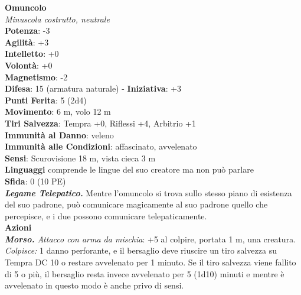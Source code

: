 \begin{multicols}{2}
\medskip\textbf{Omuncolo}\\
\emph{Minuscola costrutto, neutrale}\\
\textbf{Potenza}: -3\\
\textbf{Agilità}: +3\\
\textbf{Intelletto}: +0\\
\textbf{Volontà}: +0\\
\textbf{Magnetismo}: -2\\
\textbf{Difesa}: 15 (armatura naturale) - \textbf{Iniziativa}: +3\\
\textbf{Punti Ferita}: 5 (2d4)\\
\textbf{Movimento}: 6 m, volo 12 m\\
\textbf{Tiri Salvezza}:  Tempra +0, Riflessi +4, Arbitrio +1\\
\textbf{Immunità al Danno}: veleno\\
\textbf{Immunità alle Condizioni}: affascinato, avvelenato\\
\textbf{Sensi}: Scurovisione 18 m, vista cieca 3 m\\
\textbf{Linguaggi} comprende le lingue del suo creatore ma non può parlare\\
\textbf{Sfida}: 0 (10 PE)\smallskip\\
\emph{\textbf{Legame Telepatico.}} Mentre l'omuncolo si trova sullo stesso piano di esistenza del suo padrone, può comunicare magicamente al suo padrone quello che percepisce, e i due possono comunicare telepaticamente.\\
\smallskip\textbf{Azioni}\\
\emph{\textbf{Morso.} Attacco con arma da mischia}: +5 al colpire, portata 1 m, una creatura.\\
\emph{Colpisce:} 1 danno perforante, e il bersaglio deve riuscire un tiro salvezza su Tempra DC 10 o restare avvelenato per 1 minuto. Se il tiro salvezza viene fallito di 5 o più, il bersaglio resta invece avvelenato per 5 (1d10) minuti e mentre è avvelenato in questo modo è anche privo di sensi.\\


\end{multicols}

